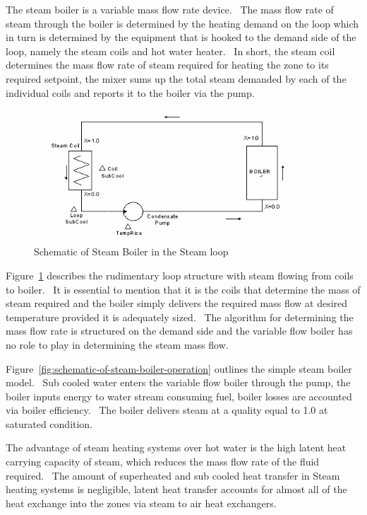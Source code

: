 The steam boiler is a variable mass flow rate device.~ The mass flow rate of steam through the boiler is determined by the heating demand on the loop which in turn is determined by the equipment that is hooked to the demand side of the loop, namely the steam coils and hot water heater.~ In short, the steam coil determines the mass flow rate of steam required for heating the zone to its required setpoint, the mixer sums up the total steam demanded by each of the individual coils and reports it to the boiler via the pump.

\begin{figure}[hbtp] %
\centering
\includegraphics[width=0.9\textwidth, height=0.9\textheight, keepaspectratio=true]{media/image2932.png}
\caption{  Schematic of Steam Boiler in the Steam loop \protect \label{fig:schematic-of-steam-boiler-in-the-steam-loop}}
\end{figure}

Figure~\ref{fig:schematic-of-steam-boiler-in-the-steam-loop} describes the rudimentary loop structure with steam flowing from coils to boiler.~ It is essential to mention that it is the coils that determine the mass of steam required and the boiler simply delivers the required mass flow at desired temperature provided it is adequately sized.~ The algorithm for determining the mass flow rate is structured on the demand side and the variable flow boiler has no role to play in determining the steam mass flow.

Figure~\ref{fig:schematic-of-steam-boiler-operation} outlines the simple steam boiler model.~ Sub cooled water enters the variable flow boiler through the pump, the boiler inputs energy to water stream consuming fuel, boiler losses are accounted via boiler efficiency.~ The boiler delivers steam at a quality equal to 1.0 at saturated condition.

The advantage of steam heating systems over hot water is the high latent heat carrying capacity of steam, which reduces the mass flow rate of the fluid required.~ The amount of superheated and sub cooled heat transfer in Steam heating systems is negligible, latent heat transfer accounts for almost all of the heat exchange into the zones via steam to air heat exchangers.

